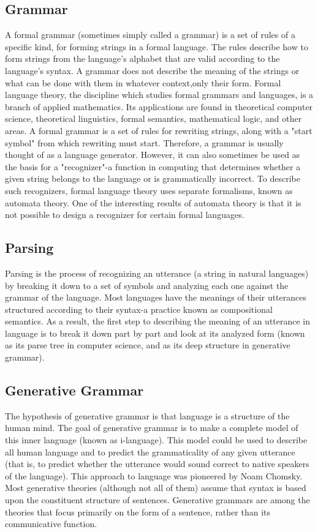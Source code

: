 \subsection{Grammar}
A formal grammar (sometimes simply called a grammar) is a set of rules of a specific kind, for forming strings in a formal language. The rules describe how to form strings from the language's alphabet that are valid according to the language's syntax. A grammar does not describe the meaning of the strings or what can be done with them in whatever context,only their form.
Formal language theory, the discipline which studies formal grammars and languages, is a branch of applied mathematics. Its applications are found in theoretical computer science, theoretical linguistics, formal semantics, mathematical logic, and other areas.
A formal grammar is a set of rules for rewriting strings, along with a "start symbol" from which rewriting must start. Therefore, a grammar is usually thought of as a language generator. However, it can also sometimes be used as the basis for a "recognizer"-a function in computing that determines whether a given string belongs to the language or is grammatically incorrect. To describe such recognizers, formal language theory uses separate formalisms, known as automata theory. One of the interesting results of automata theory is that it is not possible to design a recognizer for certain formal languages.

\subsection{Parsing}
Parsing is the process of recognizing an utterance (a string in natural languages) by breaking it down to a set of symbols and analyzing each one against the grammar of the language. Most languages have the meanings of their utterances structured according to their syntax-a practice known as compositional semantics. As a result, the first step to describing the meaning of an utterance in language is to break it down part by part and look at its analyzed form (known as its parse tree in computer science, and as its deep structure in generative grammar).

\subsection{Generative Grammar}
The hypothesis of generative grammar is that language is a structure of the human mind. The goal of generative grammar is to make a complete model of this inner language (known as i-language). This model could be used to describe all human language and to predict the grammaticality of any given utterance (that is, to predict whether the utterance would sound correct to native speakers of the language). This approach to language was pioneered by Noam Chomsky. Most generative theories (although not all of them) assume that syntax is based upon the constituent structure of sentences. Generative grammars are among the theories that focus primarily on the form of a sentence, rather than its communicative function.

